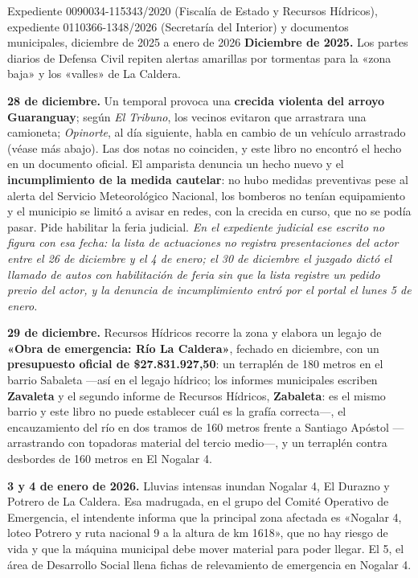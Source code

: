 \begin{ficha}{Expediente 0090034-115343/2020 (Fiscalía de Estado y Recursos Hídricos), expediente 0110366-1348/2026 (Secretaría del Interior) y documentos municipales, diciembre de 2025 a enero de 2026}
\textbf{Diciembre de 2025.} Los partes diarios de Defensa Civil repiten alertas amarillas por tormentas para la «zona baja» y los «valles» de La Caldera.

\textbf{28 de diciembre.} Un temporal provoca una \textbf{crecida violenta del arroyo Guaranguay}; según \textit{El Tribuno}, los vecinos evitaron que arrastrara una camioneta; \textit{Opinorte}, al día siguiente, habla en cambio de un vehículo arrastrado (véase más abajo). Las dos notas no coinciden, y este libro no encontró el hecho en un documento oficial. El amparista denuncia un hecho nuevo y el \textbf{incumplimiento de la medida cautelar}: no hubo medidas preventivas pese al alerta del Servicio Meteorológico Nacional, los bomberos no tenían equipamiento y el municipio se limitó a avisar en redes, con la crecida en curso, que no se podía pasar. Pide habilitar la feria judicial. \textit{En el expediente judicial ese escrito no figura con esa fecha: la lista de actuaciones no registra presentaciones del actor entre el 26 de diciembre y el 4 de enero; el 30 de diciembre el juzgado dictó el llamado de autos con habilitación de feria sin que la lista registre un pedido previo del actor, y la denuncia de incumplimiento entró por el portal el lunes 5 de enero.}

\textbf{29 de diciembre.} Recursos Hídricos recorre la zona y elabora un legajo de \textbf{«Obra de emergencia: Río La Caldera»}, fechado en diciembre, con un \textbf{presupuesto oficial de \$27.831.927,50}: un terraplén de 180 metros en el barrio Sabaleta ---así en el legajo hídrico; los informes municipales escriben \textbf{Zavaleta} y el segundo informe de Recursos Hídricos, \textbf{Zabaleta}: es el mismo barrio y este libro no puede establecer cuál es la grafía correcta---, el encauzamiento del río en dos tramos de 160 metros frente a Santiago Apóstol ---arrastrando con topadoras material del tercio medio---, y un terraplén contra desbordes de 160 metros en El Nogalar 4.

\textbf{3 y 4 de enero de 2026.} Lluvias intensas inundan Nogalar 4, El Durazno y Potrero de La Caldera. Esa madrugada, en el grupo del Comité Operativo de Emergencia, el intendente informa que la principal zona afectada es «Nogalar 4, loteo Potrero y ruta nacional 9 a la altura de km 1618», que no hay riesgo de vida y que la máquina municipal debe mover material para poder llegar. El 5, el área de Desarrollo Social llena fichas de relevamiento de emergencia en Nogalar 4.


\end{ficha}
